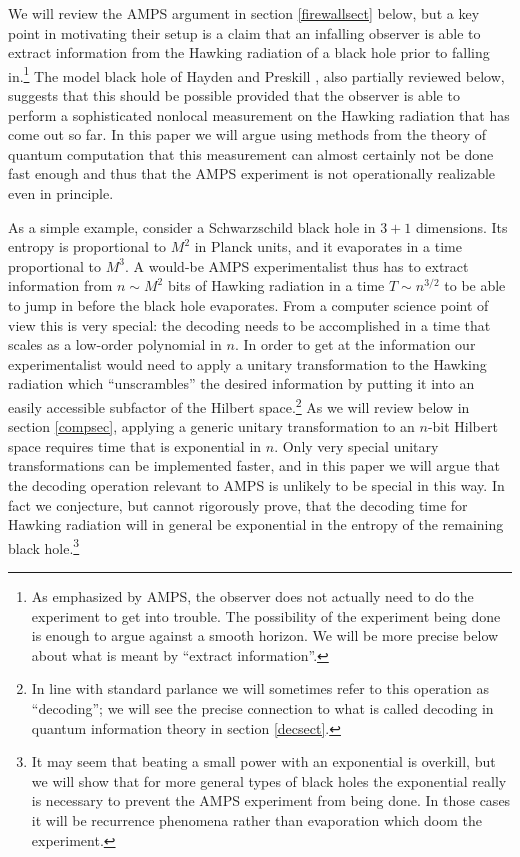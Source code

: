 \documentclass[12pt]{article}
\begin{document}
We will review the AMPS argument in section \ref{firewallsect} below, but a key point in motivating their setup is a claim that an infalling observer is able to extract information from the Hawking radiation of a black hole prior to falling in.\footnote{As emphasized by AMPS, the observer does not actually need to do the experiment to get into trouble.  The possibility of the experiment being done is enough to argue against a smooth horizon.  We will be more precise below about what is meant by ``extract information''.}  The model black hole of Hayden and Preskill \cite{HaydenPreskill}, also partially reviewed below, suggests that this should be possible provided that the observer is able to perform a sophisticated nonlocal measurement on the Hawking radiation that has come out so far.  In this paper we will argue using methods from the theory of quantum computation that this measurement can almost certainly not be done fast enough and thus that the AMPS experiment is not operationally realizable even in principle.     

As a simple example, consider a Schwarzschild black hole in $3+1$ dimensions.  Its entropy is proportional to $M^2$ in Planck units, and it evaporates in a time proportional to $M^3$.  A would-be AMPS experimentalist thus has to extract information from $n\sim M^2$ bits of Hawking radiation in a time $T\sim n^{3/2}$ to be able to jump in before the black hole evaporates.  From a computer science point of view this is very special: the decoding needs to be accomplished in a time that scales as a low-order polynomial in $n$.  In order to get at the information our experimentalist would need to apply a unitary transformation to the Hawking radiation which ``unscrambles'' the desired information by putting it into an easily accessible subfactor of the Hilbert space.\footnote{In line with standard parlance we will sometimes refer to this operation as ``decoding''; we will see the precise connection to what is called decoding in quantum information theory in section \ref{decsect}.}  As we will review below in section \ref{compsec}, applying a generic unitary transformation to an $n$-bit Hilbert space requires time that is exponential in $n$.  Only very special unitary transformations can be implemented faster, and in this paper we will argue that the decoding operation relevant to AMPS is unlikely to be special in this way.  In fact we conjecture, but cannot rigorously prove, that the decoding time for Hawking radiation will in general be exponential in the entropy of the remaining black hole.\footnote{It may seem that beating a small power with an exponential is overkill, but we will show that for more general types of black holes the exponential really is necessary to prevent the AMPS experiment from being done.  In those cases it will be recurrence phenomena rather than evaporation which doom the experiment.} 
\end{document}
